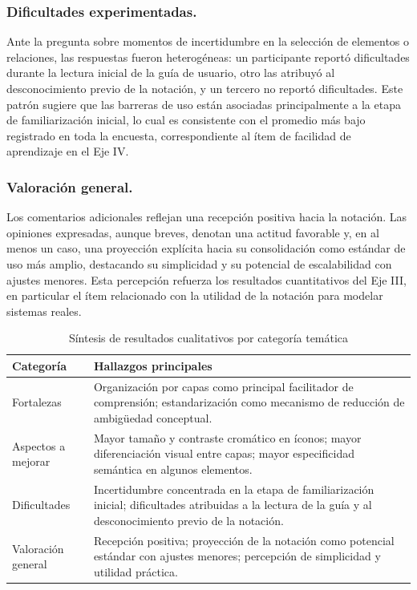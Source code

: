 \subsubsection{Dificultades experimentadas.}
Ante la pregunta sobre momentos de incertidumbre en la selección de elementos o relaciones, las respuestas fueron heterogéneas: un participante reportó dificultades durante la lectura inicial de la guía de usuario, otro las atribuyó al desconocimiento previo de la notación, y un tercero no reportó dificultades. Este patrón sugiere que las barreras de uso están asociadas principalmente a la etapa de familiarización inicial, lo cual es consistente con el promedio más bajo registrado en toda la encuesta, correspondiente al ítem de facilidad de aprendizaje en el Eje IV.

\subsubsection{Valoración general.}
Los comentarios adicionales reflejan una recepción positiva hacia la notación. Las opiniones expresadas, aunque breves, denotan una actitud favorable y, en al menos un caso, una proyección explícita hacia su consolidación como estándar de uso más amplio, destacando su simplicidad y su potencial de escalabilidad con ajustes menores. Esta percepción refuerza los resultados cuantitativos del Eje III, en particular el ítem relacionado con la utilidad de la notación para modelar sistemas reales.

\begin{table}[H]
\centering
\caption{Síntesis de resultados cualitativos por categoría temática}
\label{tab:resultados_cualitativos}
\begin{tabular}{|p{4cm}|p{10cm}|}
\hline
\textbf{Categoría} & \textbf{Hallazgos principales} \\
\hline
Fortalezas & Organización por capas como principal facilitador de comprensión; estandarización como mecanismo de reducción de ambigüedad conceptual. \\
\hline
Aspectos a mejorar & Mayor tamaño y contraste cromático en íconos; mayor diferenciación visual entre capas; mayor especificidad semántica en algunos elementos. \\
\hline
Dificultades & Incertidumbre concentrada en la etapa de familiarización inicial; dificultades atribuidas a la lectura de la guía y al desconocimiento previo de la notación. \\
\hline
Valoración general & Recepción positiva; proyección de la notación como potencial estándar con ajustes menores; percepción de simplicidad y utilidad práctica. \\
\hline
\end{tabular}
\end{table}


